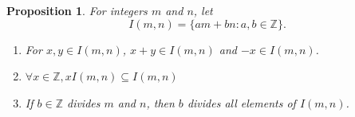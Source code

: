 \documentclass[12pt]{article}
\newtheorem{proposition}{Proposition}[subsection]
\begin{document}
    \begin{proposition}
        For integers $m$ and $n$, let
        \begin{equation}
            I(m,n) = \{am+bn:a,b \in \mathbb{Z}\}.
        \end{equation}
        \begin{enumerate}
            \item For $x, y \in I(m,n)$, $x+y \in I(m, n)$ and $-x \in I(m,n)$.
            \item $\forall x \in \mathbb{Z}, xI(m, n) \subseteq I(m,n)$
            \item If $b \in \mathbb{Z}$ divides $m$ and $n$, then $b$ divides all elements of $I(m,n)$.
        \end{enumerate}
    \end{proposition}
    
\end{document}
